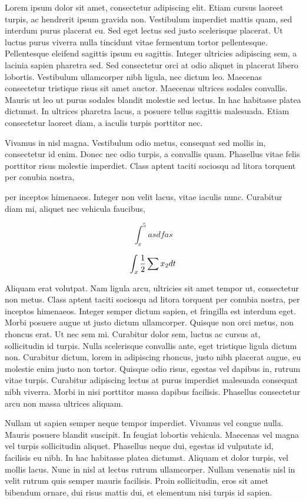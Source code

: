Lorem ipsum dolor sit amet, consectetur adipiscing elit. Etiam cursus
laoreet turpis, ac hendrerit ipsum gravida non. Vestibulum imperdiet
mattis quam, sed interdum purus placerat eu. Sed eget lectus sed justo
scelerisque placerat. Ut luctus purus viverra nulla tincidunt vitae
fermentum tortor pellentesque. Pellentesque eleifend sagittis ipsum
eu sagittis. Integer ultricies adipiscing sem, a lacinia sapien pharetra
sed. Sed consectetur orci at odio aliquet in placerat libero lobortis.
Vestibulum ullamcorper nibh ligula, nec dictum leo. Maecenas consectetur
tristique risus sit amet auctor. Maecenas ultrices sodales convallis.
Mauris ut leo ut purus sodales blandit molestie sed lectus. In hac
habitasse platea dictumst. In ultrices pharetra lacus, a posuere tellus
sagittis malesuada. Etiam consectetur laoreet diam, a iaculis turpis
porttitor nec.

Vivamus in nisl magna. Vestibulum odio metus, consequat sed mollis
in, consectetur id enim. Donec nec odio turpis, a convallis quam.
Phasellus vitae felis porttitor risus molestie imperdiet. Class aptent
taciti sociosqu ad litora torquent per conubia nostra, %
\begin{comment}
asdfasdfas
\end{comment}
per inceptos himenaeos. Integer non velit lacus, vitae iaculis nunc.
Curabitur diam mi, aliquet nec vehicula faucibus,  

\[
\int_{x}^{5}asdfas
\]

\[
\int_{x}\frac{1}{2}\sum x_{2}dt
\]

Aliquam erat volutpat. Nam ligula arcu, ultricies sit amet tempor
ut, consectetur non metus. Class aptent taciti sociosqu ad litora
torquent per conubia nostra, per inceptos himenaeos. Integer semper
dictum sapien, et fringilla est interdum eget. Morbi posuere augue
ut justo dictum ullamcorper. Quisque non orci metus, non rhoncus erat.
Ut nec sem mi. Curabitur dolor sem, luctus ac cursus at, sollicitudin
id turpis. Nulla scelerisque convallis ante, eget tristique ligula
dictum non. Curabitur dictum, lorem in adipiscing rhoncus, justo nibh
placerat augue, eu molestie enim justo non tortor. Quisque odio risus,
egestas vel dapibus in, rutrum vitae turpis. Curabitur adipiscing
lectus at purus imperdiet malesuada consequat nibh viverra. Morbi
in nisi porttitor massa dapibus facilisis. Phasellus consectetur arcu
non massa ultrices aliquam.

Nullam ut sapien semper neque tempor imperdiet. Vivamus vel congue
nulla. Mauris posuere blandit suscipit. In feugiat lobortis vehicula.
Maecenas vel magna vel turpis sollicitudin aliquet. Phasellus neque
dui, egestas id vulputate id, facilisis eu nibh. In hac habitasse
platea dictumst. Aliquam et dolor turpis, vel mollis lacus. Nunc in
nisl at lectus rutrum ullamcorper. Nullam venenatis nisl in velit
rutrum quis semper mauris facilisis. Proin sollicitudin, eros sit
amet bibendum ornare, dui risus mattis dui, et elementum nisi turpis
id sapien.

